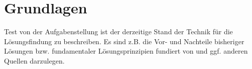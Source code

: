 

\chapter{Grundlagen}
Test von der Aufgabenstellung ist der derzeitige Stand der Technik für die Lösungsfindung zu beschreiben. Es sind z.B. die Vor- und Nachteile bisheriger Lösungen bzw. fundamentaler Lösungsprinzipien fundiert von und ggf. anderen Quellen darzulegen.
